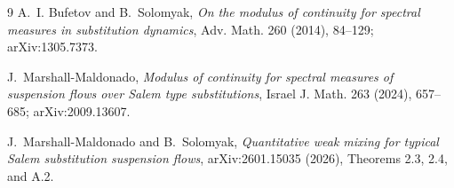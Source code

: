 \documentclass[11pt]{article}
\begin{document}
\begin{thebibliography}{9}
A.~I. Bufetov and B.~Solomyak,
\emph{On the modulus of continuity for spectral measures in substitution dynamics},
Adv. Math. 260 (2014), 84--129; arXiv:1305.7373.

J.~Marshall-Maldonado,
\emph{Modulus of continuity for spectral measures of suspension flows over Salem type substitutions},
Israel J. Math. 263 (2024), 657--685; arXiv:2009.13607.

J.~Marshall-Maldonado and B.~Solomyak,
\emph{Quantitative weak mixing for typical Salem substitution suspension flows},
arXiv:2601.15035 (2026), Theorems 2.3, 2.4, and A.2.
\end{thebibliography}
\end{document}
